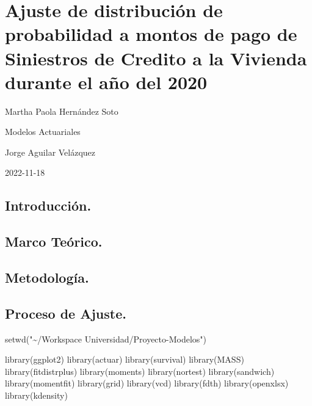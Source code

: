\documentclass[
]{article}
\author{}
\date{\vspace{-2.5em}}
\newenvironment{Shaded}{\begin{snugshade}}{\end{snugshade}}
\newcommand{\FunctionTok}[1]{\textcolor[rgb]{0.00,0.00,0.00}{#1}}
\newcommand{\NormalTok}[1]{#1}
\newcommand{\StringTok}[1]{\textcolor[rgb]{0.31,0.60,0.02}{#1}}
\begin{document}
\hypertarget{ajuste-de-distribuciuxf3n-de-probabilidad-a-montos-de-pago-de-siniestros-de-credito-a-la-vivienda-durante-el-auxf1o-del-2020}{%
\section{Ajuste de distribución de probabilidad a montos de pago de
Siniestros de Credito a la Vivienda durante el año del
2020}\label{ajuste-de-distribuciuxf3n-de-probabilidad-a-montos-de-pago-de-siniestros-de-credito-a-la-vivienda-durante-el-auxf1o-del-2020}}

Martha Paola Hernández Soto

Modelos Actuariales

Jorge Aguilar Velázquez

2022-11-18

\hypertarget{introducciuxf3n.}{%
\subsection{Introducción.}\label{introducciuxf3n.}}

\hypertarget{marco-teuxf3rico.}{%
\subsection{Marco Teórico.}\label{marco-teuxf3rico.}}

\hypertarget{metodologuxeda.}{%
\subsection{Metodología.}\label{metodologuxeda.}}

\hypertarget{proceso-de-ajuste.}{%
\subsection{Proceso de Ajuste.}\label{proceso-de-ajuste.}}

\begin{Shaded}
\begin{Highlighting}[]
\FunctionTok{setwd}\NormalTok{(}\StringTok{"\textasciitilde{}/Workspace Universidad/Proyecto{-}Modelos"}\NormalTok{)}

\FunctionTok{library}\NormalTok{(ggplot2)}
\FunctionTok{library}\NormalTok{(actuar)}
\FunctionTok{library}\NormalTok{(survival)}
\FunctionTok{library}\NormalTok{(MASS)}
\FunctionTok{library}\NormalTok{(fitdistrplus)}
\FunctionTok{library}\NormalTok{(moments)}
\FunctionTok{library}\NormalTok{(nortest)}
\FunctionTok{library}\NormalTok{(sandwich)}
\FunctionTok{library}\NormalTok{(momentfit)}
\FunctionTok{library}\NormalTok{(grid)}
\FunctionTok{library}\NormalTok{(vcd)}
\FunctionTok{library}\NormalTok{(fdth)}
\FunctionTok{library}\NormalTok{(openxlsx)}
\FunctionTok{library}\NormalTok{(kdensity)}
\end{Highlighting}
\end{Shaded}
\end{document}
